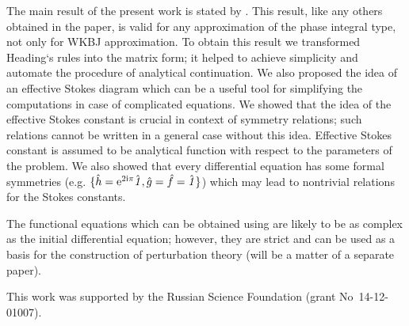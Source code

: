 \documentclass[12pt]{iopart}
\def\f{\hat{f}}
\def\g{\hat{g}}
\def\h{\hat{h}}
\def\unity{\hat{\it 1}}
\begin{document}
The main result of the present work is stated by . This result, 
like any others obtained in the paper, is valid for any approximation of the 
phase integral type, not only for WKBJ approximation. To obtain this result 
we transformed Heading`s rules \cite{heading,white} into the matrix form; 
it helped to achieve simplicity and automate the procedure of analytical continuation. 
We also proposed the idea of an effective Stokes diagram which can be a useful tool 
for simplifying the computations in case of complicated equations. 
We showed that the idea of the effective Stokes constant is crucial in context of symmetry relations;
such relations cannot be written in a general case without this idea. 
Effective Stokes constant is assumed to be analytical function with respect to 
the parameters of the problem. 
We also showed that every differential 
equation has some formal symmetries (e.g. $\{\h=\rme^{2\rmi\pi}\unity,\g=\f=\unity\}$) which may lead
to nontrivial relations for the Stokes constants. 

The functional equations which can be obtained using  are likely to be as 
complex as the initial differential equation; however, they are strict and can be used as 
a basis for the construction of perturbation theory (will be a matter of a separate paper).

\ack
This work was supported by the Russian Science Foundation (grant No~14-12-01007). 
\end{document}
